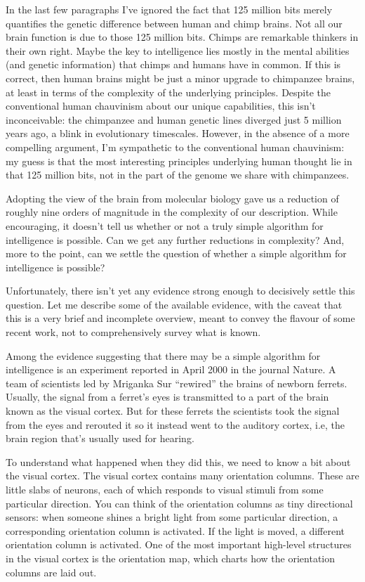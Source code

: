 \documentclass[a4paper,twoside,10pt]{book}
\begin{document}
In the last few paragraphs I've ignored the fact that 125 million bits merely quantifies the genetic difference between human and chimp brains. Not all our brain function is due to those 125 million bits. Chimps are remarkable thinkers in their own right. Maybe the key to intelligence lies mostly in the mental abilities (and genetic information) that chimps and humans have in common. If this is correct, then human brains might be just a minor upgrade to chimpanzee brains, at least in terms of the complexity of the underlying principles. Despite the conventional human chauvinism about our unique capabilities, this isn't inconceivable: the chimpanzee and human genetic lines diverged just 5 million years ago, a blink in evolutionary timescales. However, in the absence of a more compelling argument, I'm sympathetic to the conventional human chauvinism: my guess is that the most interesting principles underlying human thought lie in that 125 million bits, not in the part of the genome we share with chimpanzees.

Adopting the view of the brain from molecular biology gave us a reduction of roughly nine orders of magnitude in the complexity of our description. While encouraging, it doesn't tell us whether or not a truly simple algorithm for intelligence is possible. Can we get any further reductions in complexity? And, more to the point, can we settle the question of whether a simple algorithm for intelligence is possible?

Unfortunately, there isn't yet any evidence strong enough to decisively settle this question. Let me describe some of the available evidence, with the caveat that this is a very brief and incomplete overview, meant to convey the flavour of some recent work, not to comprehensively survey what is known.

Among the evidence suggesting that there may be a simple algorithm for intelligence is an experiment reported in April 2000 in the journal Nature. A team of scientists led by Mriganka Sur ``rewired'' the brains of newborn ferrets. Usually, the signal from a ferret's eyes is transmitted to a part of the brain known as the visual cortex. But for these ferrets the scientists took the signal from the eyes and rerouted it so it instead went to the auditory cortex, i.e, the brain region that's usually used for hearing.

To understand what happened when they did this, we need to know a bit about the visual cortex. The visual cortex contains many orientation columns. These are little slabs of neurons, each of which responds to visual stimuli from some particular direction. You can think of the orientation columns as tiny directional sensors: when someone shines a bright light from some particular direction, a corresponding orientation column is activated. If the light is moved, a different orientation column is activated. One of the most important high-level structures in the visual cortex is the orientation map, which charts how the orientation columns are laid out.
\end{document}
